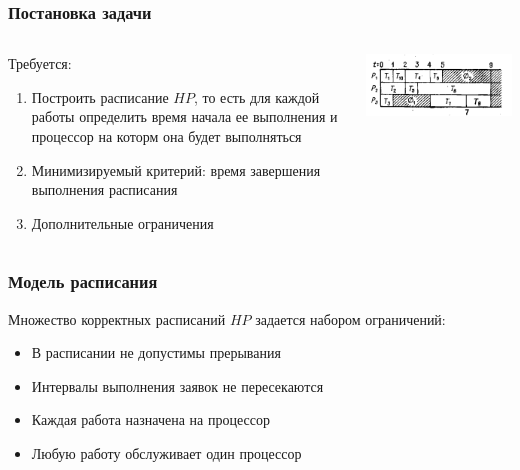 \documentclass[hyperref=unicode, aspectratio=169]{beamer}
\begin{document}
\begin{frame}
    \frametitle{Постановка задачи}
    \begin{columns}
        \begin{column}{0.6\textwidth}
            Требуется:
            \begin{enumerate}
                \item Построить расписание $HP$, то есть для каждой работы определить время начала ее выполнения и процессор на которм она будет выполняться
                \item Минимизируемый критерий: время завершения выполнения расписания
                \item Дополнительные ограничения
            \end{enumerate}
        \end{column}
        \begin{column}{0.4\textwidth}
            \includegraphics[width=\textwidth]{imgs/schedule.png}
        \end{column}
    \end{columns}
\end{frame}

\begin{frame}
    \frametitle{Модель расписания}
    Множество корректных расписаний $HP$ задается набором ограничений:
    \begin{itemize}
        \item В расписании не допустимы прерывания
        \item Интервалы выполнения заявок не пересекаются
        \item Каждая работа назначена на процессор
        \item Любую работу обслуживает один процессор
    \end{itemize}
\end{frame}
\end{document}
